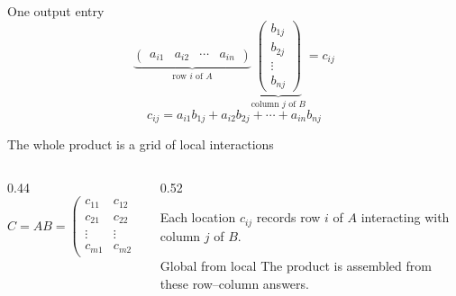 \begin{frame}{One output entry}
  \centering
  \Large
  \[
  \underbrace{\begin{pmatrix}a_{i1}&a_{i2}&\cdots&a_{in}\end{pmatrix}}_{\text{row }i\text{ of }A}
  \underbrace{\begin{pmatrix}b_{1j}\\b_{2j}\\\vdots\\b_{nj}\end{pmatrix}}_{\text{column }j\text{ of }B}
  =c_{ij}
  \]
  \vspace{0.45cm}
  \[
  c_{ij}=a_{i1}b_{1j}+a_{i2}b_{2j}+\cdots+a_{in}b_{nj}
  \]
\end{frame}

\begin{frame}{The whole product is a grid of local interactions}
  \begin{columns}[T,onlytextwidth]
    \begin{column}{0.44\textwidth}
      \[
      C=AB=\begin{pmatrix}
      c_{11}&c_{12}&\cdots&c_{1p}\\
      c_{21}&c_{22}&\cdots&c_{2p}\\
      \vdots&\vdots&\ddots&\vdots\\
      c_{m1}&c_{m2}&\cdots&c_{mp}
      \end{pmatrix}
      \]
    \end{column}
    \begin{column}{0.52\textwidth}
      \begin{block}{Each location}
        $c_{ij}$ records row $i$ of $A$ interacting with column $j$ of $B$.
      \end{block}
      \begin{exampleblock}{Global from local}
        The product is assembled from these row--column answers.
      \end{exampleblock}
    \end{column}
  \end{columns}
\end{frame}

